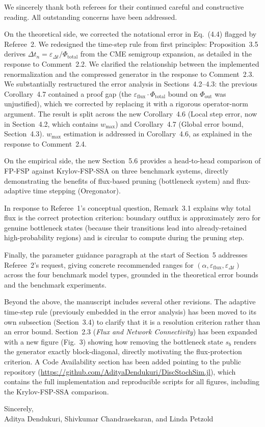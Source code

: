 \documentclass[11pt]{article}
\begin{document}
We sincerely thank both referees for their continued careful and constructive
reading. All outstanding concerns have been addressed.

On the theoretical side, we corrected the notational error in Eq.~(4.4) flagged
by Referee~2. We redesigned the time-step rule from first principles: Proposition~3.5
derives $\Delta t_n = \varepsilon_{\Delta t}/\Phi_{\mathrm{total}}$ from the CME
semigroup expansion, as detailed in the response to Comment~2.2. We clarified the
relationship between the implemented renormalization and the compressed generator
in the response to Comment~2.3. We substantially restructured the error analysis in Sections~4.2--4.3: the previous Corollary~4.7 contained a proof gap (the $\varepsilon_{\mathrm{flux}}\cdot\Phi_{\mathrm{total}}$ bound on $\Phi_{\mathrm{out}}$ was unjustified), which we corrected by replacing it with a rigorous operator-norm argument.  The result is split across the new Corollary~4.6 (Local step error, now in Section~4.2, which contains $w_{\max}$) and Corollary~4.7 (Global error bound, Section~4.3).  $w_{\max}$ estimation is addressed in Corollary~4.6, as explained in the response to Comment~2.4.

On the empirical side, the new Section~5.6 provides a head-to-head comparison
of FP-FSP against Krylov-FSP-SSA on three benchmark systems, directly
demonstrating the benefits of flux-based pruning (bottleneck system) and
flux-adaptive time stepping (Oregonator).

In response to Referee~1's conceptual question, Remark~3.1 explains why total
flux is the correct protection criterion: boundary outflux is approximately zero
for genuine bottleneck states (because their transitions lead into already-retained
high-probability regions) and is circular to compute during the pruning step.

Finally, the parameter guidance paragraph at the start of Section~5 addresses
Referee~2's request, giving concrete recommended ranges for
$(\alpha,\varepsilon_{\mathrm{flux}},\varepsilon_{\Delta t})$ across the four
benchmark model types, grounded in the theoretical error bounds and the benchmark
experiments.

Beyond the above, the manuscript includes several other revisions.  The
adaptive time-step rule (previously embedded in the error analysis) has been
moved to its own subsection (Section~3.4) to clarify that it is a resolution
criterion rather than an error bound.  Section~2.3 (\emph{Flux and Network
Connectivity}) has been expanded with a new figure (Fig.~3) showing how
removing the bottleneck state $s_b$ renders the generator exactly
block-diagonal, directly motivating the flux-protection criterion.  A Code
Availability section has been added pointing to the public repository
(\url{https://github.com/AdityaDendukuri/DiscStochSim.jl}), which contains
the full implementation and reproducible scripts for all figures, including
the Krylov-FSP-SSA comparison.

\vspace{1em}
\noindent Sincerely,\\[0.5em]
Aditya Dendukuri, Shivkumar Chandrasekaran, and Linda Petzold
\end{document}
